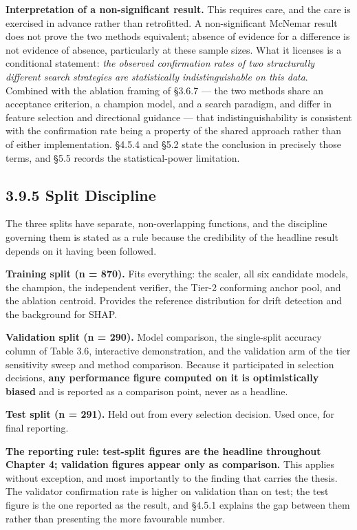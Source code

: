 \textbf{Interpretation of a non-significant result.} This requires care, and the care is exercised in advance rather than retrofitted. A non-significant McNemar result does not prove the two methods equivalent; absence of evidence for a difference is not evidence of absence, particularly at these sample sizes. What it licenses is a conditional statement: \emph{the observed confirmation rates of two structurally different search strategies are statistically indistinguishable on this data}. Combined with the ablation framing of §3.6.7 --- the two methods share an acceptance criterion, a champion model, and a search paradigm, and differ in feature selection and directional guidance --- that indistinguishability is consistent with the confirmation rate being a property of the shared approach rather than of either implementation. §4.5.4 and §5.2 state the conclusion in precisely those terms, and §5.5 records the statistical-power limitation.

\hypertarget{split-discipline}{%
\subsection{3.9.5 Split Discipline}\label{split-discipline}}

The three splits have separate, non-overlapping functions, and the discipline governing them is stated as a rule because the credibility of the headline result depends on it having been followed.

\textbf{Training split (n = 870).} Fits everything: the scaler, all six candidate models, the champion, the independent verifier, the Tier-2 conforming anchor pool, and the ablation centroid. Provides the reference distribution for drift detection and the background for SHAP.

\textbf{Validation split (n = 290).} Model comparison, the single-split accuracy column of Table 3.6, interactive demonstration, and the validation arm of the tier sensitivity sweep and method comparison. Because it participated in selection decisions, \textbf{any performance figure computed on it is optimistically biased} and is reported as a comparison point, never as a headline.

\textbf{Test split (n = 291).} Held out from every selection decision. Used once, for final reporting.

\textbf{The reporting rule: test-split figures are the headline throughout Chapter 4; validation figures appear only as comparison.} This applies without exception, and most importantly to the finding that carries the thesis. The validator confirmation rate is higher on validation than on test; the test figure is the one reported as the result, and §4.5.1 explains the gap between them rather than presenting the more favourable number.


